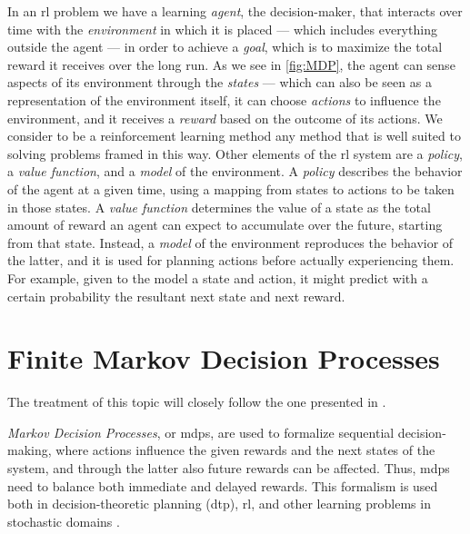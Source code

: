 In an \acrshort{rl} problem we have a learning \emph{agent}, the decision-maker, that interacts over time with the \emph{environment} in which it is placed --- which includes everything outside the agent --- in order to achieve a \emph{goal}, which is to maximize the total reward it receives over the long run. As we see in \autoref{fig:MDP}, the agent can sense aspects of its environment through the \emph{states} --- which can also be seen as a representation of the environment itself, it can choose \emph{actions} to influence the environment, and it receives a \emph{reward} based on the outcome of its actions. We consider to be a reinforcement learning method any method that is well suited to solving problems framed in this way. Other elements of the \acrshort{rl} system are a \emph{policy}, a \emph{value function}, and a \emph{model} of the environment. A \emph{policy} describes the behavior of the agent at a given time, using a mapping from states to actions to be taken in those states. A \emph{value function} determines the value of a state as the total amount of reward an agent can expect to accumulate over the future, starting from that state. Instead, a \emph{model} of the environment reproduces the behavior of the latter, and it is used for planning actions before actually experiencing them. For example, given to the model a state and action, it might predict with a certain probability the resultant next state and next reward.

\section{Finite Markov Decision Processes}

The treatment of this topic will closely follow the one presented in \cite{SuttonBarto}.

\emph{Markov Decision Processes}, or \acrshort{mdp}s, are used to formalize sequential decision-making, where actions influence the given rewards and the next states of the system, and through the latter also future rewards can be affected. Thus, \acrshort{mdp}s need to balance both immediate and delayed rewards. This formalism is used both in decision-theoretic planning (\acrshort{dtp}), \acrshort{rl}, and other learning problems in stochastic domains \cite{WierOtter12RLStateOfTheArt}.

